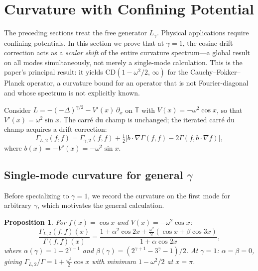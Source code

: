 \documentclass[11pt,a4paper]{article}
\theoremstyle{plain}
\newtheorem{proposition}[theorem]{Proposition}
\theoremstyle{definition}
\theoremstyle{remark}
\newcommand{\T}{\mathbb{T}}
\begin{document}
\section{Curvature with Confining Potential}\label{sec:potential}

The preceding sections treat the free generator $L_\gamma$.
Physical applications require confining potentials.
In this section we prove that at $\gamma = 1$, the cosine
drift correction acts as a \emph{scalar shift} of the entire
curvature spectrum---a global result on all modes simultaneously,
not merely a single-mode calculation.
This is the paper's principal result: it yields
$\mathrm{CD}(1 - \omega^2/2,\,\infty)$ for the
Cauchy--Fokker--Planck operator, a curvature bound for
an operator that is not Fourier-diagonal and whose spectrum
is not explicitly known.

Consider $L = -(-\Delta)^{\gamma/2} - V'(x)\,\partial_x$ on $\T$
with $V(x) = -\omega^2\cos x$, so that
$V'(x) = \omega^2\sin x$. The carr\'e du champ is unchanged;
the iterated carr\'e du champ acquires a drift correction:
\begin{equation}\label{eq:G2-drift}
  \Gamma_{L,2}(f,f) = \Gamma_{\gamma,2}(f,f)
  + \tfrac{1}{2}\bigl[
    b \cdot \nabla\Gamma(f,f) - 2\Gamma(f, b \cdot \nabla f)
  \bigr],
\end{equation}
where $b(x) = -V'(x) = -\omega^2\sin x$.


\subsection{Single-mode curvature for general $\gamma$}

Before specializing to $\gamma = 1$, we record the curvature
on the first mode for arbitrary $\gamma$, which motivates the
general calculation.

\begin{proposition}\label{thm:potential-single}
For $f(x) = \cos x$ and $V(x) = -\omega^2\cos x$:
\begin{equation}\label{eq:G2-ratio-potential}
  \frac{\Gamma_{L,2}(f,f)(x)}{\Gamma(f,f)(x)}
  = \frac{1 + \alpha^2\cos 2x + \tfrac{\omega^2}{2}(\cos x + \beta\cos 3x)}
         {1 + \alpha\cos 2x},
\end{equation}
where
$\alpha(\gamma) = 1 - 2^{\gamma-1}$ and
$\beta(\gamma) = (2^{\gamma+1} - 3^\gamma - 1)/2$.
At $\gamma = 1$: $\alpha = \beta = 0$, giving
$\Gamma_{L,2}/\Gamma = 1 + \frac{\omega^2}{2}\cos x$
with minimum $1 - \omega^2/2$ at $x = \pi$.
\end{proposition}
\end{document}
